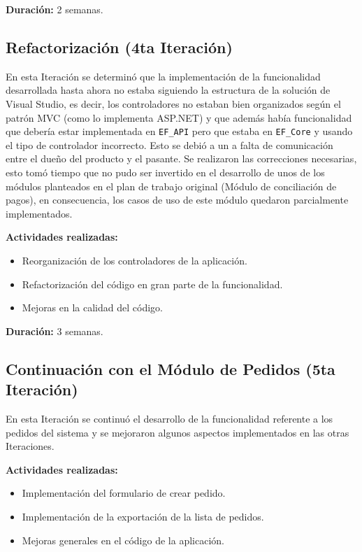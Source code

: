 \textbf{Duración:} 2 semanas.

\subsection{Refactorización (4ta Iteración)}
En esta Iteración se determinó que la implementación de la funcionalidad desarrollada hasta ahora no estaba siguiendo la estructura de la solución de Visual Studio, es decir, los controladores no estaban bien organizados según el patrón MVC (como lo implementa ASP.NET) y que además había funcionalidad que debería estar implementada en \verb|EF_API| pero que estaba en \verb|EF_Core| y usando el tipo de controlador incorrecto. Esto se debió a un a falta de comunicación entre el dueño del producto y el pasante. Se realizaron las correcciones necesarias, esto tomó tiempo que no pudo ser invertido en el desarrollo de unos de los módulos planteados en el plan de trabajo original (Módulo de conciliación de pagos), en consecuencia, los casos de uso de este módulo quedaron parcialmente implementados.

\textbf{Actividades realizadas:}
\begin{itemize}
    \item Reorganización de los controladores de la aplicación.
    \item Refactorización del código en gran parte de la funcionalidad.
    \item Mejoras en la calidad del código.
\end{itemize}

\textbf{Duración:} 3 semanas.

\subsection{Continuación con el Módulo de Pedidos (5ta Iteración)}
En esta Iteración se continuó el desarrollo de la funcionalidad referente a los pedidos del sistema y se mejoraron algunos aspectos implementados en las otras Iteraciones.

\textbf{Actividades realizadas:}
\begin{itemize}
    \item Implementación del formulario de crear pedido.
    \item Implementación de la exportación de la lista de pedidos.
    \item Mejoras generales en el código de la aplicación.
\end{itemize}

